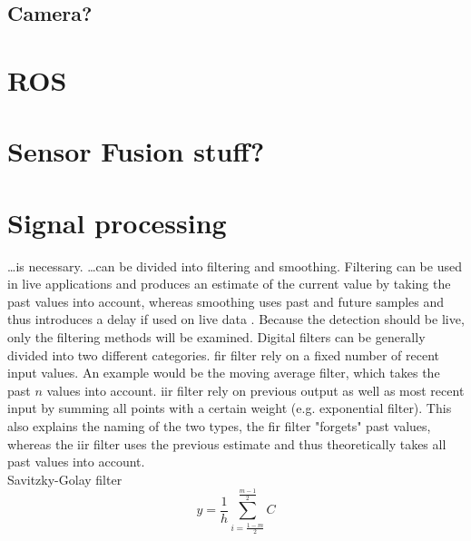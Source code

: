 \subsection{Camera?}



\section{ROS}



\section{Sensor Fusion stuff?}



\section{Signal processing}
\dots is necessary.
\dots can be divided into filtering and smoothing.
Filtering can be used in live applications and produces an estimate of the current value by taking the past values into account, whereas smoothing uses past and future samples and thus introduces a delay if used on live data .
Because the detection should be live, only the filtering methods will be examined.
Digital filters can be generally divided into two different categories.
\gls{fir} filter rely on a fixed number of recent input values. An example would be the moving average filter, which takes the past $n$ values into account.
\gls{iir} filter rely on previous output as well as most recent input by summing all points with a certain weight (e.g. exponential filter).
This also explains the naming of the two types, the \gls{fir} filter "forgets" past values, whereas the \gls{iir} filter uses the previous estimate and thus theoretically takes all past values into account.\\
Savitzky-Golay filter
\begin{equation}
	y = \frac{1}{h}\sum_{i =\frac{1 - m}{2}}^{\frac{m - 1}{2}}C
\end{equation}